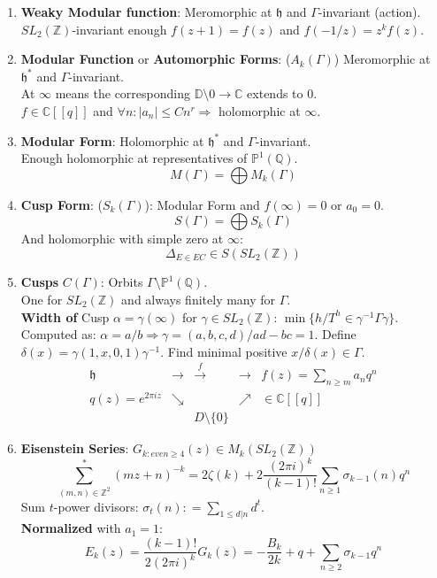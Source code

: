\documentclass{article}
\newcommand{\Q}{\mathbb{Q}}
\newcommand{\C}{\mathbb{C}}
\newcommand{\Z}{\mathbb{Z}}
\newcommand{\hh}{\mathfrak{h}}
\newcommand{\PP}{\mathbb{P}}
\newcommand{\ra}{\rightarrow}
\newcommand{\Ra}{\Rightarrow}
\newcommand{\raa}[1]{\overset{#1}{\longrightarrow}}
\begin{document}
\begin{multicols}{2}
\begin{enumerate}
\item \textbf{Weaky Modular function}: Meromorphic at $\hh$ and $\Gamma$-invariant (action).\\
$SL_2(\Z)$-invariant enough $f(z+1) = f(z)$ and $f(-1/z) = z^k f(z)$. 

\item \textbf{Modular Function} or \textbf{Automorphic Forms}: ($A_k(\Gamma)$) Meromorphic at $\hh^*$ and $\Gamma$-invariant.\\
At $\infty$ means the corresponding $\mathbb{D}\setminus0 \ra \C$ extends to $0$.\\
$f \in \C[[q]]$ and $\forall n: |a_n| \leq Cn^r \Ra$ holomorphic at $\infty$.  

\item \textbf{Modular Form}: Holomorphic at $\hh^*$ and $\Gamma$-invariant.\\
Enough holomorphic at representatives of $\PP^1(\Q)$. 
\[M(\Gamma) = \bigoplus M_k(\Gamma)\]

\item \textbf{Cusp Form}: ($S_k(\Gamma)$): Modular Form and $f(\infty) = 0$ or $a_0 = 0$.
\[S(\Gamma) = \bigoplus S_k(\Gamma)\]
And holomorphic with simple zero at $\infty$:
\[\Delta_{E \in EC} \in S(SL_2(\Z))\]

\item \textbf{Cusps} $C(\Gamma)$: Orbits $\Gamma\setminus \PP^1(\Q)$. \\
One for $SL_2(\Z)$ and always finitely many for $\Gamma$. \\
\textbf{Width of} Cusp $\alpha = \gamma(\infty)$ for $\gamma \in SL_2(\Z)$: $\min\{h/ T^h \in \gamma^{-1}\Gamma \gamma\}$. Computed as: $\alpha = a/b \Ra \gamma = (a,b,c,d)/ ad - bc = 1$. Define $\delta(x) = \gamma (1,x,0,1) \gamma^{-1}$. Find minimal positive $x/ \delta(x) \in \Gamma$.
\[\begin{array}{ccccc}
\hh & \ra & \raa{f} & \ra & f(z) = \sum_{n \geq m} a_n q^n \\
q(z) = e^{2\pi i z}  & \searrow & & \nearrow & \in \C[[q]]\\
&& D\setminus \{0\} 
\end{array}\]

  
\item \textbf{Eisenstein Series}: $G_{k: even \geq 4}(z) \in M_k(SL_2(\Z))$
\[\sum^*_{(m,n)\in \Z^2}(mz+n)^{-k} = 2\zeta(k) + 2\frac{(2\pi i)^k}{(k-1)!} \sum_{n \geq 1} \sigma_{k-1}(n) q^n\]
Sum $t$-power divisors: $\sigma_t(n): = \sum_{1 \leq d|n} d^t$.\\
\textbf{Normalized} with $a_1 = 1$:
\[E_k(z) = \frac{(k-1)!}{2(2\pi i)^k} G_k(z) = -\frac{B_k}{2k} + q +  \sum_{n \geq 2} \sigma_{k-1}q^n\]


\end{enumerate}
\end{multicols}
\end{document}
